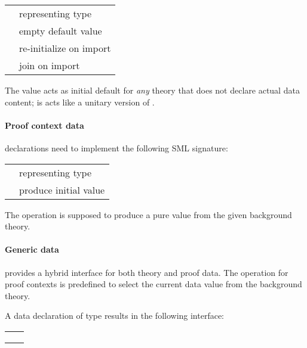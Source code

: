 \begin{isabellebody}
\begin{isamarkuptext}
  \medskip
  \begin{tabular}{ll}
  \isa{{\isasymtype}\ T} & representing type \\
  \isa{{\isasymval}\ empty{\isacharcolon}\ T} & empty default value \\
  \isa{{\isasymval}\ extend{\isacharcolon}\ T\ {\isasymrightarrow}\ T} & re-initialize on import \\
  \isa{{\isasymval}\ merge{\isacharcolon}\ T\ {\isasymtimes}\ T\ {\isasymrightarrow}\ T} & join on import \\
  \end{tabular}
  \medskip

  \noindent The  value acts as initial default for
  \emph{any} theory that does not declare actual data content;  is acts like a unitary version of .

  \paragraph{Proof context data} declarations need to implement the
  following SML signature:

  \medskip
  \begin{tabular}{ll}
  \isa{{\isasymtype}\ T} & representing type \\
  \isa{{\isasymval}\ init{\isacharcolon}\ theory\ {\isasymrightarrow}\ T} & produce initial value \\
  \end{tabular}
  \medskip

  \noindent The  operation is supposed to produce a pure
  value from the given background theory.

  \paragraph{Generic data} provides a hybrid interface for both theory
  and proof data.  The  operation for proof contexts is
  predefined to select the current data value from the background
  theory.

  \bigskip A data declaration of type  results in the
  following interface:

  \medskip
  \begin{tabular}{ll}
  \isa{get{\isacharcolon}\ context\ {\isasymrightarrow}\ T} \\
  \isa{put{\isacharcolon}\ T\ {\isasymrightarrow}\ context\ {\isasymrightarrow}\ context} \\
  \isa{map{\isacharcolon}\ {\isacharparenleft}T\ {\isasymrightarrow}\ T{\isacharparenright}\ {\isasymrightarrow}\ context\ {\isasymrightarrow}\ context} \\
  \end{tabular}
  \medskip


\end{isamarkuptext}
\end{isabellebody}

